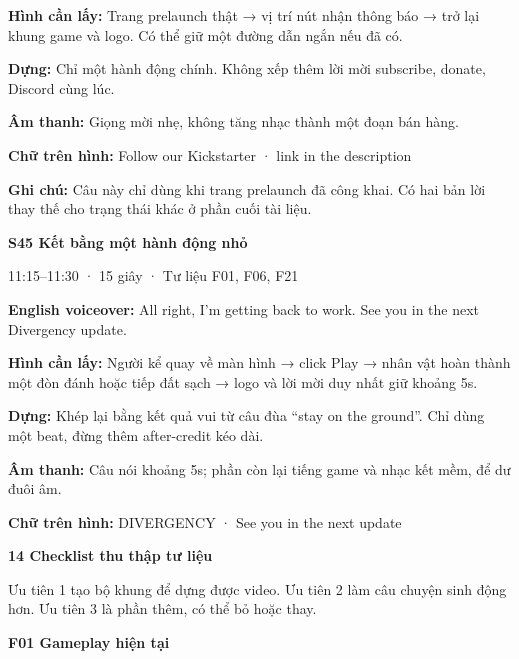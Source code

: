 \documentclass[10pt,a4paper]{article}
\begin{document}
\textbf{Hình cần lấy:}  Trang prelaunch thật → vị trí nút nhận thông báo → trở lại khung game và logo. Có thể giữ một đường dẫn ngắn nếu đã có.\par

\textbf{Dựng:}  Chỉ một hành động chính. Không xếp thêm lời mời subscribe, donate, Discord cùng lúc.\par

\textbf{Âm thanh:}  Giọng mời nhẹ, không tăng nhạc thành một đoạn bán hàng.\par

\textbf{Chữ trên hình:}  Follow our Kickstarter · link in the description\par

\textbf{Ghi chú:}  Câu này chỉ dùng khi trang prelaunch đã công khai. Có hai bản lời thay thế cho trạng thái khác ở phần cuối tài liệu.\par

\textbf{S45 Kết bằng một hành động nhỏ}\par

11:15–11:30 · 15 giây · Tư liệu F01, F06, F21\par

\textbf{English voiceover:}  All right, I’m getting back to work. See you in the next Divergency update.\par

\textbf{Hình cần lấy:}  Người kể quay về màn hình → click Play → nhân vật hoàn thành một đòn đánh hoặc tiếp đất sạch → logo và lời mời duy nhất giữ khoảng 5s.\par

\textbf{Dựng:}  Khép lại bằng kết quả vui từ câu đùa “stay on the ground”. Chỉ dùng một beat, đừng thêm after-credit kéo dài.\par

\textbf{Âm thanh:}  Câu nói khoảng 5s; phần còn lại tiếng game và nhạc kết mềm, để dư đuôi âm.\par

\textbf{Chữ trên hình:}  DIVERGENCY · See you in the next update\par

\textbf{14 Checklist thu thập tư liệu}\par

Ưu tiên 1 tạo bộ khung để dựng được video. Ưu tiên 2 làm câu chuyện sinh động hơn. Ưu tiên 3 là phần thêm, có thể bỏ hoặc thay.\par

\textbf{F01 Gameplay hiện tại}\par
\end{document}
